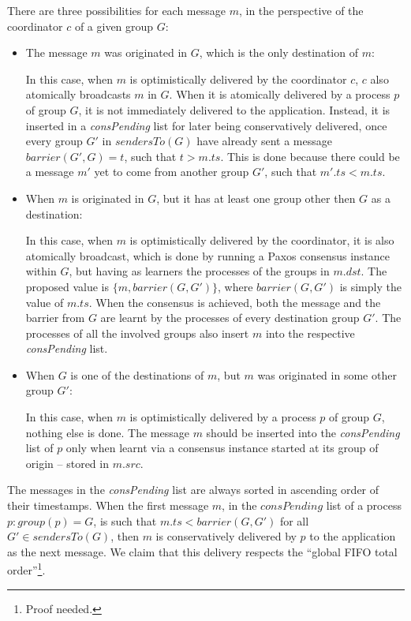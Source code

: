 \documentclass[times, 10pt]{article}
\begin{document}
There are three possibilities for each message $m$, in the perspective of the coordinator $c$ of a given group $G$:

\begin{itemize}
  \item The message $m$ was originated in $G$, which is the only destination of $m$:
  
  In this case, when $m$ is optimistically delivered by the coordinator $c$, $c$ also atomically broadcasts $m$ in $G$. When it is atomically delivered by a process $p$ of group $G$, it is not immediately delivered to the application. Instead, it is inserted in a \textit{consPending} list for later being conservatively delivered, once every group $G'$ in $sendersTo(G)$ have already sent a message $barrier(G',G) = t$, such that $t > m.ts$. This is done because there could be a message $m'$ yet to come from another group $G'$, such that $m'.ts < m.ts$.

  \item When $m$ is originated in $G$, but it has at least one group other then $G$ as a destination:
  
  In this case, when $m$ is optimistically delivered by the coordinator, it is also atomically broadcast, which is done by running a Paxos consensus instance within $G$, but having as learners the processes of the groups in $m.dst$. The proposed value is $\{m, barrier(G, G')\}$, where $barrier(G,G')$ is simply the value of $m.ts$. When the consensus is achieved, both the message and the barrier from $G$ are learnt by the processes of every destination group $G'$. The processes of all the involved groups also insert $m$ into the respective \textit{consPending} list.
  
  \item When $G$ is one of the destinations of $m$, but $m$ was originated in some other group $G'$:
  
  In this case, when $m$ is optimistically delivered by a process $p$ of group $G$, nothing else is done. The message $m$ should be inserted into the \mbox{\textit{consPending}} list of $p$ only when learnt via a consensus instance started at its group of origin -- stored in $m.src$.
\end{itemize}

The messages in the \textit{consPending} list are always sorted in ascending order of their timestamps. When the first message $m$, in the $consPending$ list of a process $p : group(p) = G$, is such that $m.ts < barrier(G, G')$ for all $G' \in sendersTo(G)$, then $m$ is conservatively delivered by $p$ to the application as the next message. We claim that this delivery respects the ``global FIFO total order''\footnote{Proof needed.}.
\end{document}
